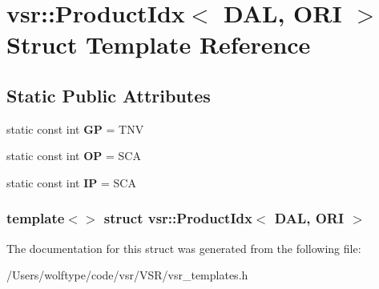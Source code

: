 \hypertarget{structvsr_1_1_product_idx_3_01_d_a_l_00_01_o_r_i_01_4}{\section{vsr\-:\-:Product\-Idx$<$ D\-A\-L, O\-R\-I $>$ Struct Template Reference}
\label{structvsr_1_1_product_idx_3_01_d_a_l_00_01_o_r_i_01_4}
}
\subsection*{Static Public Attributes}
\begin{DoxyCompactItemize}
\item 
\hypertarget{structvsr_1_1_product_idx_3_01_d_a_l_00_01_o_r_i_01_4_a8812f47c9877ad0104ee4e823613361f}{static const int {\bfseries G\-P} = T\-N\-V}\label{structvsr_1_1_product_idx_3_01_d_a_l_00_01_o_r_i_01_4_a8812f47c9877ad0104ee4e823613361f}

\item 
\hypertarget{structvsr_1_1_product_idx_3_01_d_a_l_00_01_o_r_i_01_4_a73bedf5fe6f1d090c2983e71225bac52}{static const int {\bfseries O\-P} = S\-C\-A}\label{structvsr_1_1_product_idx_3_01_d_a_l_00_01_o_r_i_01_4_a73bedf5fe6f1d090c2983e71225bac52}

\item 
\hypertarget{structvsr_1_1_product_idx_3_01_d_a_l_00_01_o_r_i_01_4_ab21fbf9ffea26e352141feabd0e10786}{static const int {\bfseries I\-P} = S\-C\-A}\label{structvsr_1_1_product_idx_3_01_d_a_l_00_01_o_r_i_01_4_ab21fbf9ffea26e352141feabd0e10786}

\end{DoxyCompactItemize}
\subsubsection*{template$<$$>$ struct vsr\-::\-Product\-Idx$<$ D\-A\-L, O\-R\-I $>$}



The documentation for this struct was generated from the following file\-:\begin{DoxyCompactItemize}
\item 
/\-Users/wolftype/code/vsr/\-V\-S\-R/vsr\-\_\-templates.\-h\end{DoxyCompactItemize}
